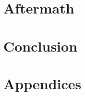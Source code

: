 \documentclass[12pt]{article}
\begin{document}
\section{Aftermath}

\section{Conclusion}


\section*{Appendices}

\newpage
\printbibliography
\end{document}
